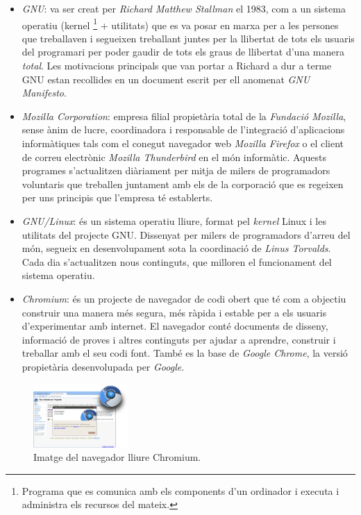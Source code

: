 \begin{itemize}

\item \emph{GNU}: va ser creat per \emph{Richard Matthew Stallman} el 1983, com a un sistema operatiu (kernel \footnote{Programa que es comunica amb els components d'un ordinador i executa i administra els recursos del mateix.} + utilitats) que es va posar en marxa per a les persones que treballaven i segueixen treballant juntes per la llibertat de tots els usuaris del programari per poder gaudir de tots els graus de llibertat d'una manera \emph{total}. Les motivacions principals que van portar a Richard a dur a terme GNU estan recollides en un document escrit per ell anomenat \emph{GNU Manifesto}. \cite{GNUExit} \cite{GNUExitII} \cite{GNUMan} \cite{GvsM}

\item \emph{Mozilla Corporation}: empresa filial propietària total de la \emph{Fundació Mozilla}, sense ànim de lucre, coordinadora i responsable de l'integració d'aplicacions informàtiques tals com el conegut navegador web \emph{Mozilla Firefox} o el client de correu electrònic \emph{Mozilla Thunderbird} en el món informàtic. Aquests programes s'actualitzen diàriament per mitja de milers de programadors voluntaris que treballen juntament amb els de la corporació que es regeixen per uns principis que l'empresa té establerts. \cite{MozExit} \cite{MozExitII} \cite{MozFesto}

\item \emph{GNU/Linux}: és un sistema operatiu lliure, format pel \emph{kernel} Linux i les utilitats del projecte GNU. Dissenyat per milers de programadors d'arreu del món, segueix en desenvolupament sota la coordinació de \emph{Linus Torvalds}. Cada dia s'actualitzen nous continguts, que milloren el funcionament del sistema operatiu. \cite{LinExit} \cite{POSIX}

\item \emph{Chromium}: és un projecte de navegador de codi obert que té com a objectiu construir una manera més segura, més ràpida i estable per a els usuaris d'experimentar amb internet. El navegador conté documents de disseny, informació de proves i altres continguts per ajudar a aprendre, construir i treballar amb el seu codi font. També es la base de \emph{Google Chrome}, la versió propietària desenvolupada per \emph{Google}. \cite{Chrom} 
\end{itemize}

\begin{figure}[ht!]
\centering
\includegraphics[width=36mm]{data/chromium.png}
\caption{Imatge del navegador lliure Chromium.}
\label{chromium}
\end{figure}